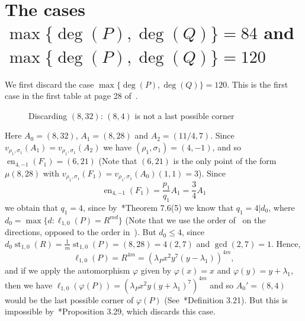 \documentclass[reqno,a4paper,twoside]{amsart}
\theoremstyle{definition}
\theoremstyle{remark}
\DeclareMathOperator{\en}{en}
\DeclareMathOperator{\st}{st}
\begin{document}
\section{The cases $\max\{\deg(P),\deg(Q)\}=84$ and $\max\{\deg(P),\deg(Q)\}=120$}
\label{seccion 2}
We first discard the case $\max\{\deg(P),\deg(Q)\}=120$. This is the first case in the first table at page 28 of~\cite{GGV5}.

\begin{figure}[htb]
\centering
{}
\caption{Discarding $(8,32)$: $(8,4)$ is not a last possible corner}
\end{figure}

Here $A_0=(8,32)$, $A_1=(8,28)$ and $A_2=(11/4,7)$. Since
$v_{\rho_1,\sigma_1}(A_1)=v_{\rho_1,\sigma_1}(A_2)$ we have $(\rho_1,\sigma_1)=(4,-1)$, and so $\en_{4,-1}(F_1)=(6,21)$ (Note that $(6,21)$
is the only point of the form $\mu(8,28)$ with $v_{\rho_1,\sigma_1}(F_1)=v_{\rho_1,\sigma_1}(A_0)(1,1)=3$).  Since
$$
\en_{4,-1}(F_1)=\frac {p_1}{q_1} A_1=\frac 34 A_1
$$
we obtain that $q_1=4$, since by~\cite{GGV1}*{Theorem 7.6(5)} we know that $q_1=4|d_0$, where $d_0=\max\{d: \ell_{1,0}(P)=R^{md}\}$ (Note that
we use the order of~\cite{GGV5} on the directions, opposed to the order in~\cite{GGV1}). But $d_0\le 4$, since
$d_0\st_{1,0}(R)=\frac{1}{m}\st_{1,0}(P)=(8,28)=4(2,7)$ and $\gcd(2,7)=1$. Hence,
$$
\ell_{1,0}(P)=R^{4m}=(\lambda_P x^2 y^{7}(y-\lambda_1))^{4m},
$$
and if we apply the automorphism $\varphi$ given by $\varphi(x)= x$ and $\varphi(y)=y+\lambda_1$, then
we have $\ell_{1,0}(\varphi(P))= (\lambda_P x^2 y (y+\lambda_1)^{7})^{4m}$ and so $A_0'=(8,4)$ would be the last possible corner
of $\varphi(P)$ (See~\cite{GGV2}*{Definition 3.21}). But this is impossible
by~\cite{GGV2}*{Proposition 3.29}, which discards this case.
\end{document}
